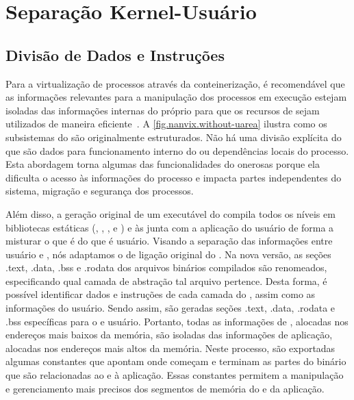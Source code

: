 \section{Separação Kernel-Usuário}
\label{sec.dev.kernel-usuario}

\subsection{Divisão de Dados e Instruções}
\label{sec.divisao-dados-instrucao}

    Para a virtualização de processos através da conteinerização, é recomendável que as informações relevantes para a manipulação dos processos em execução estejam isoladas das informações internas do próprio \os para que os recursos de \hardware sejam utilizados de maneira eficiente~\cite{choudhary2017critical}.
    A \autoref{fig.nanvix.without-uarea} ilustra como os subsistemas do \nanvix são originalmente estruturados. Não há uma divisão explícita do que são dados para funcionamento interno do \os ou dependências locais do processo.
    Esta abordagem torna algumas das funcionalidades do \os onerosas porque ela dificulta o acesso às informações do processo e impacta partes independentes do sistema, \eg migração e segurança dos processos.

    Além disso, a geração original de um executável do \nanvix compila todos os níveis em bibliotecas estáticas (\hal, \microkernel, \libnanvix, \ulibc e \multikernel) e às junta com a aplicação do usuário de forma a misturar o que é  do que é usuário.
    Visando a separação das informações entre usuário e , nós adaptamos o \script de ligação original do \nanvix. Na nova versão, as seções .text, .data, .bss e .rodata dos arquivos binários compilados são renomeados, especificando qual camada de abstração tal arquivo pertence. Desta forma, é possível identificar dados e instruções de cada camada do \nanvix, assim como as informações do usuário. Sendo assim, são geradas seções .text, .data, .rodata e .bss específicas para o  e usuário. Portanto, todas as informações de , alocadas nos endereços mais baixos da memória, são isoladas das informações de aplicação, alocadas nos endereços mais altos da memória. Neste processo, são exportadas algumas constantes que apontam onde começam e terminam as partes do binário que são relacionadas ao  e à aplicação. Essas constantes permitem a manipulação e gerenciamento mais precisos dos segmentos de memória do  e da aplicação.
    
